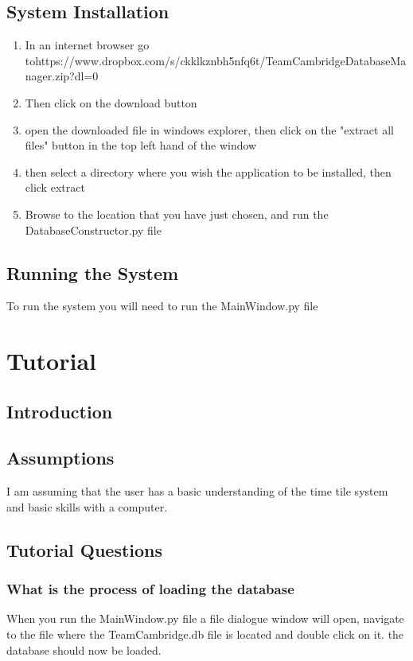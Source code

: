 \subsection{System Installation}
\begin{enumerate}
\item In an internet browser go to\newline https://www.dropbox.com/s/ckklkznbh5nfq6t/TeamCambridgeDatabaseManager.zip?dl=0
\item Then click on the download button
\item open the downloaded file in windows explorer, then click on the "extract all files" button in the top left hand of the window
\item then select a directory where you wish the application to be installed, then click extract
\item Browse to the location that you have just chosen, and run the  DatabaseConstructor.py file
\end{enumerate}
\subsection{Running the System}
To run the system you will need to run the MainWindow.py file
\section{Tutorial}

\subsection{Introduction}

\subsection{Assumptions}
I am assuming that the user has a basic understanding of the time tile system and basic skills with a computer.
\subsection{Tutorial Questions}

\subsubsection{What is the process of loading the database}
When you run the MainWindow.py file a file dialogue window will open, navigate to the file where the TeamCambridge.db file is located and double click on it. the database should now be loaded.

